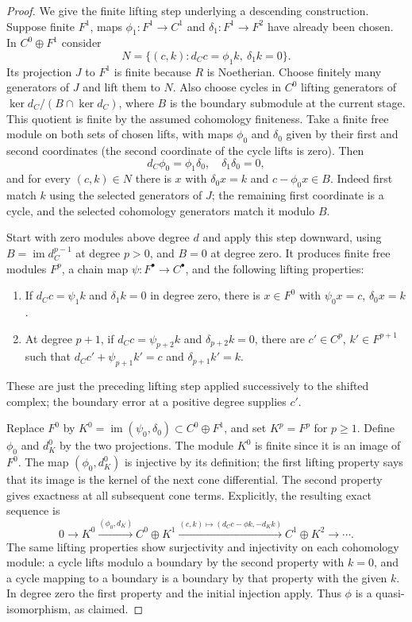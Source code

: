 \documentclass[11pt,a4paper]{article}
\numberwithin{equation}{section}
\theoremstyle{remark}\newtheorem{remark}[theorem]{Remark}
\begin{document}
\begin{proof}
We give the finite lifting step underlying a descending construction.
Suppose finite $F^1$, maps $\phi_1:F^1\to C^1$ and
$\delta_1:F^1\to F^2$ have already been chosen.  In
$C^0\oplus F^1$ consider
\[
 N=\{(c,k):d_Cc=\phi_1k,\ \delta_1k=0\}.
\]
Its projection $J$ to $F^1$ is finite because $R$ is Noetherian.
Choose finitely many generators of $J$ and lift them to $N$.  Also
choose cycles in $C^0$ lifting generators of
$\ker d_C/(B\cap\ker d_C)$, where $B$ is the boundary submodule
at the current stage.  This quotient is finite by the assumed
cohomology finiteness.  Take a finite free module on both sets of
chosen lifts, with maps $\phi_0$ and $\delta_0$ given by their first
and second coordinates (the second coordinate of the cycle lifts is
zero).  Then
\[
 d_C\phi_0=\phi_1\delta_0,\quad
 \delta_1\delta_0=0,
\]
and for every $(c,k)\in N$ there is $x$ with
$\delta_0x=k$ and $c-\phi_0x\in B$.  Indeed first match $k$ using
the selected generators of $J$; the remaining first coordinate is a
cycle, and the selected cohomology generators match it modulo $B$.

Start with zero modules above degree $d$ and apply this step downward,
using $B=\operatorname{im}d_C^{p-1}$ at degree $p>0$, and $B=0$
at degree zero.  It produces finite free modules $F^p$, a chain map
$\psi:F^\bullet\to C^\bullet$, and the following lifting
properties:
\begin{enumerate}
 \item If $d_Cc=\psi_1k$ and $\delta_1k=0$ in degree zero,
 there is $x\in F^0$ with $\psi_0x=c$, $\delta_0x=k$.
 \item At degree $p+1$, if $d_Cc=\psi_{p+2}k$ and
 $\delta_{p+2}k=0$, there are $c'\in C^p$, $k'\in F^{p+1}$
 such that $d_Cc'+\psi_{p+1}k'=c$ and $\delta_{p+1}k'=k$.
\end{enumerate}
These are just the preceding lifting step applied successively to the
shifted complex; the boundary error at a positive degree supplies $c'$.

Replace $F^0$ by
$K^0=\operatorname{im}(\psi_0,\delta_0)\subset C^0\oplus F^1$,
and set $K^p=F^p$ for $p\ge1$.  Define $\phi_0$ and $d_K^0$
by the two projections.  The module $K^0$ is finite since it is an
image of $F^0$.  The map $(\phi_0,d_K^0)$ is injective by its
definition; the first lifting property says that its image is the
kernel of the next cone differential.  The second property gives
exactness at all subsequent cone terms.  Explicitly, the resulting
exact sequence is
\[
 0\longrightarrow K^0\xrightarrow{(\phi_0,d_K)}
 C^0\oplus K^1\xrightarrow{(c,k)\mapsto(d_Cc-\phi k,-d_Kk)}
 C^1\oplus K^2\longrightarrow\cdots . \tag{GSL.4}
\]
The same lifting properties show surjectivity and injectivity on each
cohomology module: a cycle lifts modulo a boundary by the second
property with $k=0$, and a cycle mapping to a boundary is a boundary
by that property with the given $k$.  In degree zero the first
property and the initial injection apply.  Thus $\phi$ is a
quasi-isomorphism, as claimed.
\end{proof}
\end{document}
